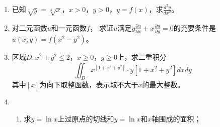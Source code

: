 \begin{enumerate}
\begin{enumerate}
	
	
\end{enumerate}




\item 
已知$\sqrt[x]{y}=\sqrt[y]{x} $，$  x>0 $，$  y>0 $，$  y=f(x)$，求$\frac{d^2 y}{d x^2}$。



\item 
对二元函数$ u $和一元函数$ f $，
求证$ u $满足$y \frac{\partial u}{\partial x}+x \frac{\partial u}{\partial y}=0 $的充要条件是$  u(x, y)=f\left(x^2-y^2\right)  $。



\item 
区域$D: x^2+y^2 \leqslant 2 $，$  x \geqslant 0 $，$  y \geqslant 0 $上，求二重积分
\[
\iint_D x^{\left[1+x^2+y^2\right]} \cdot y\left[1+x^2+y^2\right] d x d y
\]
其中$ \left[x\right]$为向下取整函数，表示取不大于$ x $的最大整数。




\item 
\begin{enumerate}
	\item
求$y=\ln x$上过原点的切线和$y=\ln x$和$ x $轴围成的面积；


\end{enumerate}
\end{enumerate}
